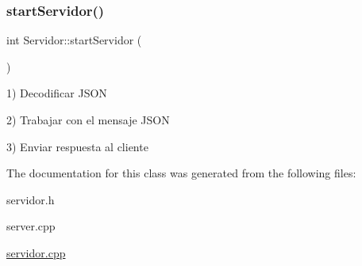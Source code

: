\subsubsection{\texorpdfstring{start\+Servidor()}{startServidor()}}
{\footnotesize\ttfamily int Servidor\+::start\+Servidor (\begin{DoxyParamCaption}{ }\end{DoxyParamCaption})}

1) Decodificar J\+S\+ON

2) Trabajar con el mensaje J\+S\+ON

3) Enviar respuesta al cliente 

The documentation for this class was generated from the following files\+:\begin{DoxyCompactItemize}
\item 
servidor.\+h\item 
server.\+cpp\item 
\mbox{\hyperlink{servidor_8cpp}{servidor.\+cpp}}\end{DoxyCompactItemize}
